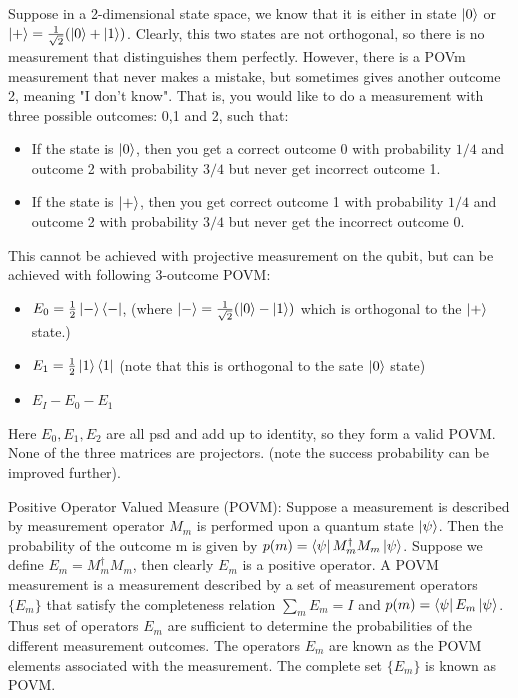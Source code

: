 \begin{example}
    Suppose in a 2-dimensional state space, we know that it is either in state $\ket{0}$ or $\ket{+}=\frac{1}{\sqrt{2}}(\ket{0}+\ket{1})$.
    Clearly, this two states are not orthogonal, so there is no measurement that distinguishes them perfectly. However, there is a POVm measurement that never makes a mistake,
    but sometimes gives another outcome 2, meaning "I don't know". That is, you would like to do a measurement with three possible outcomes: 0,1 and 2, such that:
    \begin{itemize}
        \item If the state is $\ket{0}$, then you get a correct outcome 0 with probability $1/4$ and outcome 2 with 
        probability $3/4$ but never get incorrect outcome 1.
        \item If the state is $\ket{+}$, then you get correct outcome 1 with probability $1/4$ and outcome 2 with probability $3/4$ but never get the incorrect outcome 0.
    \end{itemize}
    This cannot be achieved with projective measurement on the qubit, but can be achieved with following 3-outcome POVM:
    \begin{itemize}
        \item $E_0=\frac{1}{2}\ket{-}\bra{-}$, (where $\ket{-}=\frac{1}{\sqrt{2}}(\ket{0}-\ket{1})$ which is orthogonal to the $\ket{+}$ state.)
        \item $E_1=\frac{1}{2}\ket{1}\bra{1}$ (note that this is orthogonal to the sate $\ket{0}$ state)
        \item $E_I-E_0-E_1$
    \end{itemize}
    Here $E_0,E_1,E_2$ are all psd and add up to identity, so they form a valid POVM. None of the three matrices are projectors. (note the success probability can be improved further).
\end{example}
\begin{definition}
    Positive Operator Valued Measure (POVM): Suppose a measurement is described by measurement operator $M_m$ is performed upon a quantum state $\ket{\psi}$. Then the probability of 
    the outcome m is given by $p(m)=\bra{\psi}M_m^{\dagger}M_m\ket{\psi}$. Suppose we define $E_m=M_m^{\dagger}M_m$, then clearly $E_m$ is a positive operator. A POVM measurement is a measurement described by a set of measurement operators $\{E_m\}$ that satisfy the 
    completeness relation $\sum_m E_m=I$ and $p(m)=\bra{\psi}E_m\ket{\psi}$. Thus set of operators $E_m$ are sufficient to determine the probabilities of the different measurement outcomes.
    The operators $E_m$ are known as the POVM elements associated with the measurement. The complete set $\{E_m\}$ is known as POVM.
\end{definition}
